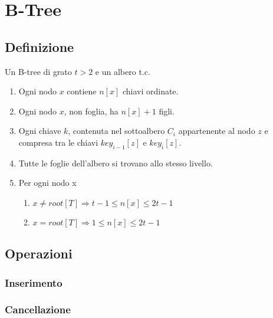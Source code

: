 
\chapter{B-Tree}

\section{Definizione}

Un B-tree di grato \( t > 2 \) e un albero t.c.
\begin{enumerate}
	\item Ogni nodo \( x \) contiene \( n[x] \) chiavi ordinate.
	\item Ogni nodo \( x \), non foglia, ha \( n[x]+1 \) figli.
	\item Ogni chiave \( k \), contenuta nel sottoalbero \( C_i \) appartenente al nodo \( z \) e compresa tra le chiavi \( key_{i-1}[z] \) e \( key_{i}[z] \).
	\item Tutte le foglie dell'albero si trovano allo stesso livello.
	\item Per ogni nodo x
	\begin{enumerate}
		\item \( x \neq root[T] \Rightarrow t-1 \leq n[x] \leq 2t - 1 \)
		\item \( x = root[T] \Rightarrow 1 \leq n[x] \leq 2t - 1 \)
	\end{enumerate}
\end{enumerate}

\section{Operazioni}
\subsection{Inserimento}
\subsection{Cancellazione}